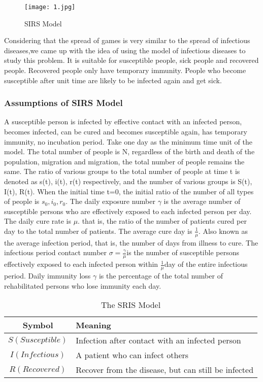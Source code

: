 \documentclass[12pt]{article}  %
\begin{document}
\begin{figure}[htbp]
	\centering
	\texttt{[image: 1.jpg]}
	\caption{SIRS Model}\label{fig:result}
\end{figure}



Considering that the spread of games is very similar to the spread of infectious diseases,we came up with the idea of using the model of infectious diseases to study this problem.
It is suitable for susceptible people, sick people and recovered people. Recovered people only have temporary immunity. People who become susceptible after unit time are likely to be infected again and get sick.



\subsubsection{Assumptions of SIRS Model}
A susceptible person is infected by effective contact with an infected person, becomes infected, can be cured and becomes susceptible again, has temporary immunity, no incubation period. Take one day as the minimum time unit of the model. The total number of people is N, regardless of the birth and death of the population, migration and migration, the total number of people remains the same. The ratio of various groups to the total number of people at time t is denoted as s(t), i(t), r(t) respectively, and the number of various groups is S(t), I(t), R(t). When the initial time t=0, the initial ratio of the number of all types of people is $s_0, i_0, r_0$. The daily exposure number $\gamma$ is the average number of susceptible persons who are effectively exposed to each infected person per day. The daily cure rate is $\mu$. that is, the ratio of the number of patients cured per day to the total number of patients. The average cure day is $\frac{1}{\mu}$. Also known as the average infection period, that is, the number of days from illness to cure. The infectious period contact number $\sigma=\frac{\gamma}{\mu}$is the number of susceptible persons effectively exposed to each infected person within $\frac{1}{\mu}$day of the entire infectious period. Daily immunity loss $\gamma$ is the percentage of the total number of rehabilitated persons who lose immunity each day.


\begin{table}[!htbp]
	\begin{center}
		\caption{The  SRIS Model}
		\begin{tabular}{cl}
			\toprule
			\multicolumn{1}{m{2cm}}{\centering Symbol}
			&\multicolumn{1}{m{8cm}}{\centering Meaning}\\
			\midrule
			$S (Susceptible)$&   \qquad\qquad\qquad Infection after contact with an infected person\\
			$I (Infectious)$&   \qquad\qquad\qquad A patient who can infect others\\
			$R (Recovered)$ &  \qquad\qquad\qquad  Recover from the disease, but can still be infected\\
			\bottomrule
		\end{tabular}\label{tb:notation}
	\end{center}
\end{table}
\end{document}
